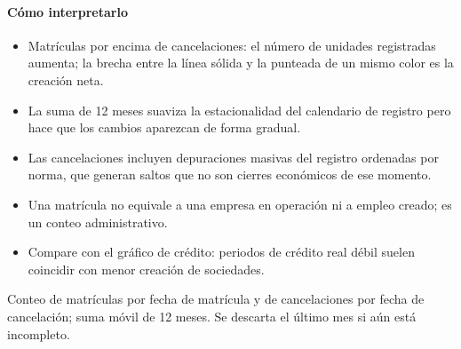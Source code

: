 \paragraph{Cómo interpretarlo}
\begin{itemize}
\item Matrículas por encima de cancelaciones: el número de unidades registradas aumenta; la brecha entre la línea sólida y la punteada de un mismo color es la creación neta.
\item La suma de 12 meses suaviza la estacionalidad del calendario de registro pero hace que los cambios aparezcan de forma gradual.
\item Las cancelaciones incluyen depuraciones masivas del registro ordenadas por norma, que generan saltos que no son cierres económicos de ese momento.
\item Una matrícula no equivale a una empresa en operación ni a empleo creado; es un conteo administrativo.
\item Compare con el gráfico de crédito: periodos de crédito real débil suelen coincidir con menor creación de sociedades.
\end{itemize}
\begin{formulas}[Fórmulas]
\end{formulas}
\begin{metodo}[Metodología]
Conteo de matrículas por fecha de matrícula y de cancelaciones por fecha de cancelación; suma móvil de 12 meses. Se descarta el último mes si aún está incompleto.
\par{}
\end{metodo}

